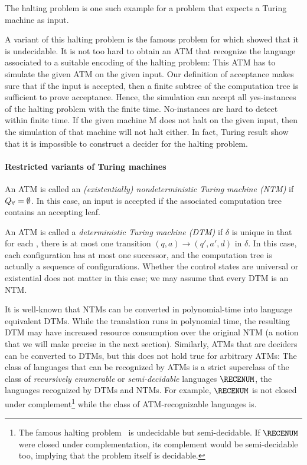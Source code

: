 \documentclass[../../diss.tex]{subfiles}
\begin{document}
The halting problem is one such example for a problem that expects a Turing machine as input.

\begin{problem}
\end{problem}

A variant of this halting problem is the famous problem for which  showed that it is undecidable.
It is not too hard to obtain an ATM that recognize the language associated to a suitable encoding of the halting problem:
This ATM has to simulate the given ATM on the given input.
Our definition of acceptance makes sure that if the input is accepted, then a finite subtree of the computation tree is sufficient to prove acceptance.
Hence, the simulation can accept all yes-instances of the halting problem with the finite time.
No-instances are hard to detect within finite time.
If the given machine M does not halt on the given input, then the simulation of that machine will not halt either.
In fact, Turing result show that it is impossible to construct a decider for the halting problem.

\paragraph{Restricted variants of Turing machines}

An ATM is called an \emph{(existentially) nondeterministic Turing machine (NTM)} if $Q_\forall = \emptyset$.
In this case, an input is accepted if the associated computation tree contains an accepting leaf.

An ATM is called a \emph{deterministic Turing machine (DTM)} if $\delta$ is unique in that for each , there is at most one transition $(q,a) \to (q',a',d)$ in $\delta$.
In this case, each configuration has at most one successor, and the computation tree is actually a sequence of configurations.
Whether the control states are universal or existential does not matter in this case; we may assume that every DTM is an NTM.\@

It is well-known that NTMs can be converted in polynomial-time into language equivalent DTMs.
While the translation runs in polynomial time, the resulting DTM may have increased resource consumption over the original NTM (a notion that we will make precise in the next section).
Similarly, ATMs that are deciders can be converted to DTMs, but this does not hold true for arbitrary ATMs:
The class of languages that can be recognized by ATMs is a strict superclass of the class of \emph{recursively enumerable} or \emph{semi-decidable} languages $\RECENUM$, the languages recognized by DTMs and NTMs.
For example, $\RECENUM$ is not closed under complement\footnote{The famous halting problem~\cite{Turing36} is undecidable but semi-decidable. If $\RECENUM$ were closed under complementation, its complement would be semi-decidable too, implying that the problem itself is decidable.} while the class of ATM-recognizable languages is.
\end{document}
